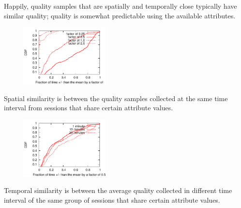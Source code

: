 Happily, quality samples that are spatially and temporally close typically have similar quality; quality is somewhat predictable using the available attributes.

\begin{figure}[h!]
\centering
 \includegraphics[width=0.4\textwidth] {figures/spatial-similarity.pdf}
\label{fig:spatial-similarity}
\end{figure}

 Spatial similarity is between the quality samples collected at the same time interval from sessions that share certain attribute values. 

\begin{figure}[h!]
\centering
 \includegraphics[width=0.4\textwidth] {figures/temporal-similarity.pdf}
\label{fig:temporal-similarity}
\end{figure}

 Temporal similarity is between the average quality collected in different time interval of the same group of sessions that share certain attribute values. 

